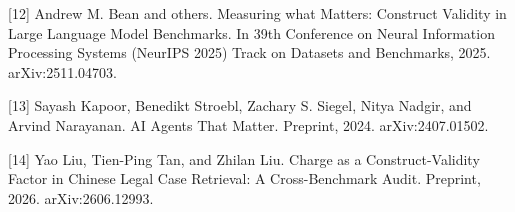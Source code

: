 \documentclass{article}
\begin{document}
[12] Andrew M. Bean and others. Measuring what Matters: Construct Validity in Large Language Model Benchmarks. In 39th Conference on Neural Information Processing Systems (NeurIPS 2025) Track on Datasets and Benchmarks, 2025. arXiv:2511.04703.

[13] Sayash Kapoor, Benedikt Stroebl, Zachary S. Siegel, Nitya Nadgir, and Arvind Narayanan. AI Agents That Matter. Preprint, 2024. arXiv:2407.01502.

[14] Yao Liu, Tien-Ping Tan, and Zhilan Liu. Charge as a Construct-Validity Factor in Chinese Legal Case Retrieval: A Cross-Benchmark Audit. Preprint, 2026. arXiv:2606.12993.

\end{document}
